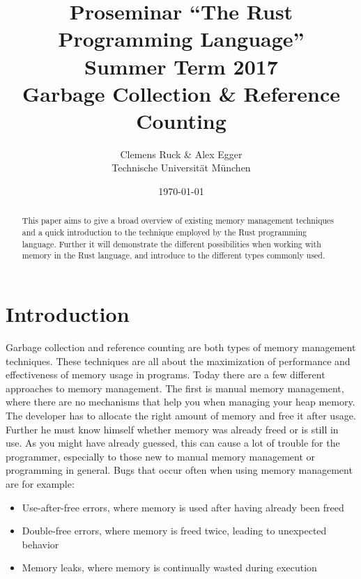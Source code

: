 \documentclass[twocolumn]{article}
\author{Clemens Ruck \& Alex Egger\\ Technische Universit\"at M\"unchen}
\title{Proseminar ``The Rust Programming Language'' \\
       Summer Term 2017 \\
       {\bf Garbage Collection \& Reference Counting}
}
\date{\today}
\begin{document}
\maketitle

\begin{abstract}
This paper aims to give a broad overview of existing memory management techniques
and a quick introduction to the technique employed by the Rust programming language.
Further it will demonstrate the different possibilities when working with memory in
the Rust language, and introduce to the different types commonly used.
\end{abstract}

\section{Introduction}
Garbage collection and reference counting are both types of memory management techniques.
These techniques are all about the maximization of performance and effectiveness of memory usage in programs.
Today there are a few different approaches to memory management.
The first is manual memory management, where there are no mechanisms that help you when managing your heap memory.
The developer has to allocate the right amount of memory and free it after usage.
Further he must know himself whether memory was already freed or is still in use.
As you might have already guessed, this can cause a lot of trouble for the programmer, especially to those new to manual memory management or programming in general.
Bugs that occur often when using memory management are for example:
\begin{itemize}
    \item Use-after-free errors, where memory is used after having already been freed
    \item Double-free errors, where memory is freed twice, leading to unexpected behavior
    \item Memory leaks, where memory is continually wasted during execution
\end{itemize}
\end{document}

